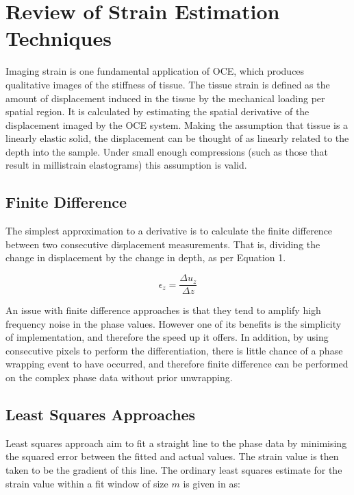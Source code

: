\chapter{Review of Strain Estimation Techniques}

Imaging strain is one fundamental application of OCE, which produces qualitative images of the stiffness of tissue. The tissue strain is defined as the amount of displacement induced in the tissue by the mechanical loading per spatial region. It is calculated by estimating the spatial derivative of the displacement imaged by the OCE system. Making the assumption that tissue is a linearly elastic solid, the displacement can be thought of as linearly related to the depth into the sample. Under small enough compressions (such as those that result in millistrain elastograms) this assumption is valid. 

\section{Finite Difference}
The simplest approximation to a derivative is to calculate the finite difference between two consecutive displacement measurements. That is, dividing the change in displacement by the change in depth, as per Equation 1.

\begin{equation}
\epsilon_z = \frac{\Delta u_z}{\Delta z}
\end{equation}

An issue with finite difference approaches is that they tend to amplify high frequency noise in the phase values. However one of its benefits is the simplicity of implementation, and therefore the speed up it offers. In addition, by using consecutive pixels to perform the differentiation, there is little chance of a phase wrapping event to have occurred, and therefore finite difference can be performed on the complex phase data without prior unwrapping.

\section{Least Squares Approaches}
Least squares approach aim to fit a straight line to the phase data by minimising the squared error between the fitted and actual values. The strain value is then taken to be the gradient of this line. The ordinary least squares estimate for the strain value within a fit window of size $m$ is given in \cite{kennedy_strain_2012} as:

